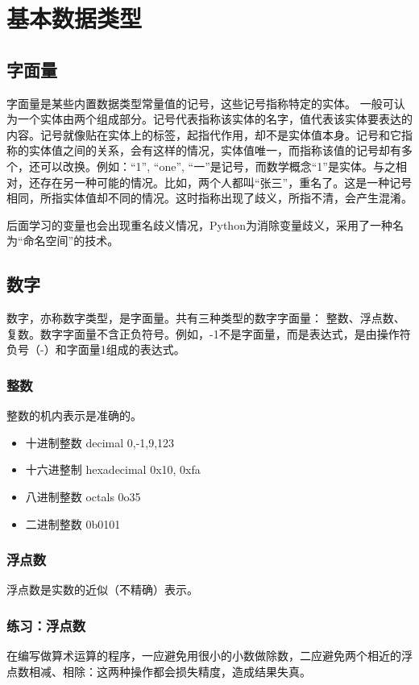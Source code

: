 \chapter{基本数据类型}

\section{字面量}
\label{literal}
字面量是某些内置数据类型常量值的记号，这些记号指称特定的实体。 一般可认为一个实体由两个组成部分。记号代表指称该实体的名字，值代表该实体要表达的内容。记号就像贴在实体上的标签，起指代作用，却不是实体值本身。记号和它指称的实体值之间的关系，会有这样的情况，实体值唯一，而指称该值的记号却有多个，还可以改换。例如：“1”, “one”, “一”是记号，而数学概念“1”是实体。与之相对，还存在另一种可能的情况。比如，两个人都叫“张三”，重名了。这是一种记号相同，所指实体值却不同的情况。这时指称出现了歧义，所指不清，会产生混淆。

后面学习的变量也会出现重名歧义情况，Python为消除变量歧义，采用了一种名为“命名空间”的技术。

\section{数字}
数字，亦称数字类型，是字面量。共有三种类型的数字字面量： 整数、浮点数、复数。数字字面量不含正负符号。例如，-1不是字面量，而是表达式，是由操作符负号（-）和字面量1组成的表达式。
\subsection{整数}
整数的机内表示是准确的。
\begin{itemize}
\item 十进制整数 decimal 0,-1,9,123
\item 十六进整制 hexadecimal 0x10, 0xfa
\item 八进制整数 octals 0o35
\item 二进制整数 0b0101
\end{itemize}
\subsection{浮点数}
浮点数是实数的近似（不精确）表示。
\subsection{练习：浮点数}
在编写做算术运算的程序，一应避免用很小的小数做除数，二应避免两个相近的浮点数相减、相除：这两种操作都会损失精度，造成结果失真。

